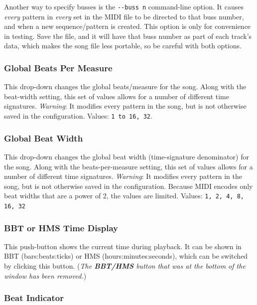    Another way to specify busses is the
   \texttt{-{}-buss n} command-line option.
   It causes \textsl{every} pattern in \textsl{every} set in the MIDI
   file to be directed to that buss number, and when a new
   sequence/pattern is created.  This option is only
   for convenience in testing.  Save the file, and it will
   have that buss number as part of each track's data, which makes the song
   file less portable, so be careful with both options.

\subsubsection{Global Beats Per Measure}
\label{subsubsec:introduction_global_beats_per_measure}

   This drop-down changes the global beats/measure for the song.
   Along with the beat-width setting, this set of values allows
   for a number of different time signatures.
   \textsl{Warning}: It modifies every pattern in the song, but is not
   otherwise saved in the configuration.
   Values: \texttt{1 to 16, 32}.

\subsubsection{Global Beat Width}
\label{subsubsec:introduction_global_beat_width}

   This drop-down changes the global beat width (time-signature denominator)
   for the song.
   Along with the beats-per-measure setting, this set of values allows
   for a number of different time signatures.
   \textsl{Warning}: It modifies every pattern in the song, but is not
   otherwise saved in the configuration.
   Because MIDI encodes only beat widths that are a power of 2, the values are
   limited.
   Values: \texttt{1, 2, 4, 8, 16, 32}

\subsubsection{BBT or HMS Time Display}
\label{subsubsec:introduction_time_display}

   This push-button shows the current time during playback. 
   It can be shown in BBT (bars:beats:ticks) or HMS (hours:minutes:seconds),
   which can be switched by clicking this button.
   (\textsl{The \textbf{BBT/HMS} button that was
   at the bottom of the window has been removed.})

\subsubsection{Beat Indicator}
\label{subsubsec:introduction_beat_indicator}

